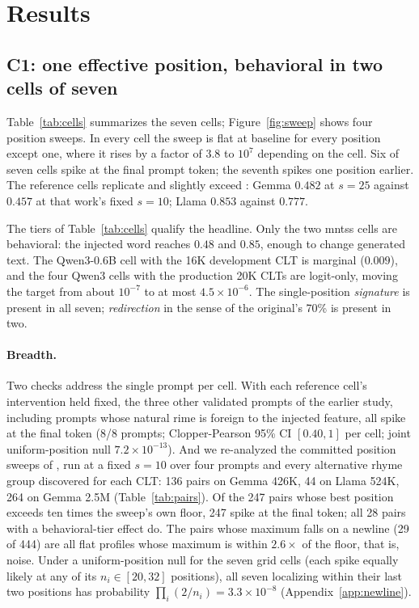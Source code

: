 \documentclass[11pt]{article}
\begin{document}
\section{Results}

\subsection{C1: one effective position, behavioral in two cells of seven}
\label{sec:localization}

Table~\ref{tab:cells} summarizes the seven cells; Figure~\ref{fig:sweep} shows four position sweeps. In every cell the sweep is flat at baseline for every position except one, where it rises by a factor of $3.8$ to $10^{7}$ depending on the cell. Six of seven cells spike at the final prompt token; the seventh spikes one position earlier. The reference cells replicate and slightly exceed \citet{jacopin2026prolepsis}: Gemma $0.482$ at $s{=}25$ against $0.457$ at that work's fixed $s{=}10$; Llama $0.853$ against $0.777$.

The tiers of Table~\ref{tab:cells} qualify the headline. Only the two mntss cells are behavioral: the injected word reaches $0.48$ and $0.85$, enough to change generated text. The Qwen3-0.6B cell with the 16K development CLT is marginal ($0.009$), and the four Qwen3 cells with the production 20K CLTs are logit-only, moving the target from about $10^{-7}$ to at most $4.5\times10^{-6}$. The single-position \emph{signature} is present in all seven; \emph{redirection} in the sense of the original's 70\% is present in two.

\paragraph{Breadth.}
Two checks address the single prompt per cell. With each reference cell's intervention held fixed, the three other validated prompts of the earlier study, including prompts whose natural rime is foreign to the injected feature, all spike at the final token (8/8 prompts; Clopper-Pearson 95\% CI $[0.40,1]$ per cell; joint uniform-position null $7.2\times10^{-13}$). And we re-analyzed the committed position sweeps of \citet{pliprs2026}, run at a fixed $s{=}10$ over four prompts and every alternative rhyme group discovered for each CLT: 136 pairs on Gemma 426K, 44 on Llama 524K, 264 on Gemma 2.5M (Table~\ref{tab:pairs}). Of the 247 pairs whose best position exceeds ten times the sweep's own floor, 247 spike at the final token; all 28 pairs with a behavioral-tier effect do. The pairs whose maximum falls on a newline (29 of 444) are all flat profiles whose maximum is within $2.6\times$ of the floor, that is, noise. Under a uniform-position null for the seven grid cells (each spike equally likely at any of its $n_i\in[20,32]$ positions), all seven localizing within their last two positions has probability $\prod_i(2/n_i)=3.3\times10^{-8}$ (Appendix~\ref{app:newline}).
\end{document}
